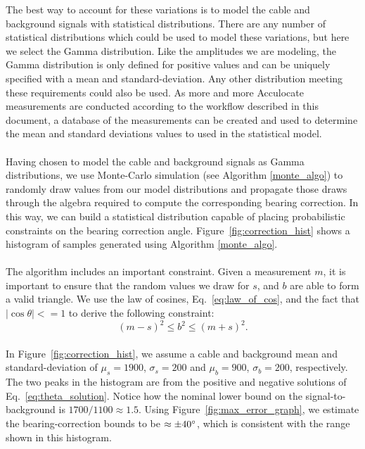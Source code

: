 \documentclass[paper=a4, fontsize=11pt]{scrartcl}
\numberwithin{equation}{section}		%
\numberwithin{figure}{section}			%
\numberwithin{table}{section}				%
\begin{document}
\begin{appendices}
The best way to account for these variations is to model the cable and background signals with statistical distributions.  There are any number of statistical distributions which could be used to model these variations, but here we select the Gamma distribution.  Like the amplitudes we are modeling, the Gamma distribution is only defined for positive values and can be uniquely specified with a mean and standard-deviation.  Any other distribution meeting these requirements could also be used.  As more and more Acculocate measurements are conducted according to the workflow described in this document, a database of the measurements can be created and used to determine the mean and standard deviations values to used in the statistical model.  

\paragraph{}
Having chosen to model the cable and background signals as Gamma distributions, we use Monte-Carlo simulation (see Algorithm \ref{monte_algo}) to randomly draw values from our model distributions and propagate those draws through the algebra required to compute the corresponding bearing correction.  In this way, we can build a statistical distribution capable of placing probabilistic constraints on the bearing correction angle.  Figure~\ref{fig:correction_hist} shows a histogram of samples generated using Algorithm \ref{monte_algo}.  

\paragraph{}
The algorithm includes an important constraint.  Given a measurement $m$, it is important to ensure that the random values we draw for $s$, and $b$ are able to form a valid triangle. We use the law of cosines, Eq.~\ref{eq:law_of_cos}, and the fact that $\left|\cos\theta\right| <=1$ to derive the following constraint:
    \begin{equation} \label{eq:bounds}
          \left(m-s\right)^2 \leq b ^ 2 \leq \left(m + s\right)^2.  
    \end{equation}

\paragraph{}
In Figure~\ref{fig:correction_hist}, we assume a cable and background mean and standard-deviation of $\mu_s=1900$, $\sigma_s=200$ and  $\mu_b=900$, $\sigma_b=200$, respectively.  The two peaks in the histogram are from the positive and negative solutions of Eq.~\ref{eq:theta_solution}. Notice how the nominal lower bound on the signal-to-background is $1700/1100 \approx 1.5$.  Using Figure~\ref{fig:max_error_graph}, we estimate the bearing-correction bounds to be $\approx\pm40\degree$, which is consistent with the range shown in this histogram.


\end{appendices}
\end{document}
